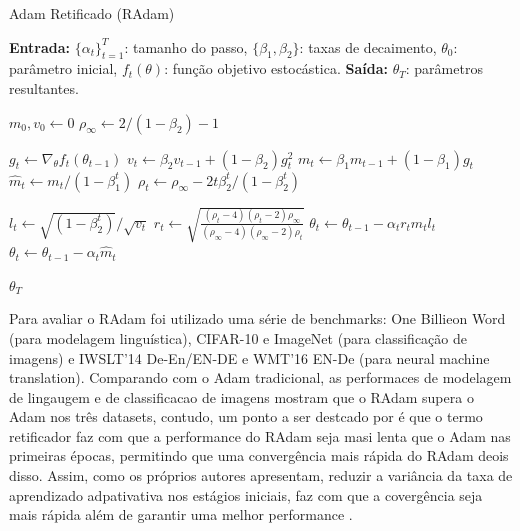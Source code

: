 \begin{algorithm}[H]
\caption{Adam Retificado (RAdam)}
\label{alg:radam}
\begin{algorithmic}[1]

\State \textbf{Entrada:} $\{\alpha_t\}_{t=1}^T$: tamanho do passo, $\{\beta_1, \beta_2\}$: taxas de decaimento, $\theta_0$: parâmetro inicial, $f_t(\theta)$: função objetivo estocástica.
\State \textbf{Saída:} $\theta_T$: parâmetros resultantes.

\State $m_0, v_0 \leftarrow 0$ 
\State $\rho_{\infty} \leftarrow 2 / (1 - \beta_2) - 1$ 

    \State $g_t \leftarrow \nabla_\theta f_t(\theta_{t-1})$ 
    \State $v_t \leftarrow \beta_2 v_{t-1} + (1 - \beta_2) g_t^2$ 
    \State $m_t \leftarrow \beta_1 m_{t-1} + (1 - \beta_1) g_t$ 
    \State $\hat{m}_t \leftarrow m_t / (1 - \beta_1^t)$ 
    \State $\rho_t \leftarrow \rho_{\infty} - 2t \beta_2^t / (1 - \beta_2^t)$ 
    
        \State $l_t \leftarrow \sqrt{(1 - \beta_2^t)} / \sqrt{v_t}$ 
        \State $r_t \leftarrow \sqrt{\frac{(\rho_t - 4)(\rho_t - 2)\rho_{\infty}}{(\rho_{\infty} - 4)(\rho_{\infty} - 2)\rho_t}}$ 
        \State $\theta_t \leftarrow \theta_{t-1} - \alpha_t r_t \hat{m}_t l_t$ 
    \Else
        \State $\theta_t \leftarrow \theta_{t-1} - \alpha_t \hat{m}_t$ 
    \EndIf
\EndFor

\State \Return $\theta_T$
\end{algorithmic}
\end{algorithm}

Para avaliar o RAdam foi utilizado uma série de benchmarks: One Billieon Word (para modelagem linguística), CIFAR-10 e ImageNet (para classificação de imagens) e IWSLT’14 De-En/EN-DE e WMT’16 EN-De  (para neural machine translation). Comparando com o Adam tradicional, as performaces de modelagem de lingaugem e de classificacao de imagens mostram que o RAdam supera o Adam nos três datasets, contudo, um ponto a ser destcado por \textcite{RAdamMethod} é que o termo retificador faz com que a performance do RAdam seja masi lenta que o Adam nas primeiras épocas, permitindo que uma convergência mais rápida do RAdam deois disso. Assim, como os próprios autores apresentam, reduzir a variância da taxa de aprendizado adpativativa nos estágios iniciais, faz com que a covergência seja mais rápida além de garantir uma melhor performance \parencite{RAdamMethod}.

